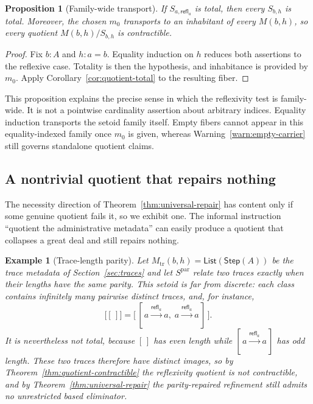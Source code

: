 \documentclass[10pt,reqno]{amsart}
\newtheorem{proposition}[theorem]{Proposition}
\newtheorem{example}[theorem]{Example}
\newcommand{\Step}{\mathsf{Step}}
\newcommand{\refl}{\mathsf{refl}}
\newcommand{\List}{\mathsf{List}}
\newcommand{\Empty}{[\,]}
\begin{document}
\begin{proposition}[Family-wide transport]
\label{prop:family-total}
If \(S_{a,\refl_a}\) is total, then every \(S_{b,h}\) is total.  Moreover, the
chosen \(m_0\) transports to an inhabitant of every \(M(b,h)\), so every
quotient \(M(b,h)/S_{b,h}\) is contractible.
\end{proposition}

\begin{proof}
Fix \(b:A\) and \(h:a=b\).  Equality induction on \(h\) reduces both assertions
to the reflexive case.  Totality is then the hypothesis, and inhabitance is
provided by \(m_0\).  Apply Corollary~\ref{cor:quotient-total} to the resulting
fiber.
\end{proof}

This proposition explains the precise sense in which the reflexivity test is
family-wide.  It is not a pointwise cardinality assertion about arbitrary
indices.  Equality induction transports the setoid family itself.  Empty
fibers cannot appear in this equality-indexed family once \(m_0\) is given,
whereas Warning~\ref{warn:empty-carrier} still governs standalone quotient
claims.

\subsection{A nontrivial quotient that repairs nothing}
\label{subsec:parity}

The necessity direction of Theorem~\ref{thm:universal-repair} has content only
if some genuine quotient fails it, so we exhibit one.  The informal instruction
``quotient the administrative metadata'' can easily
produce a quotient that collapses a great deal and still repairs nothing.

\begin{example}[Trace-length parity]
\label{ex:parity}
Let \(M_{\mathrm{tr}}(b,h)=\List(\Step(A))\) be the trace metadata of
Section~\ref{sec:traces} and let \(S^{\mathrm{par}}\) relate two traces exactly
when their lengths have the same parity.  This setoid is far from discrete: each
class contains infinitely many pairwise distinct traces, and, for instance,
\[
 \bigl[\Empty\bigr]
 =
 \bigl[\,[\,a\xrightarrow{\refl_a}a,\;a\xrightarrow{\refl_a}a\,]\,\bigr].
\tag{5.8}\label{eq:parity-collapse}
\]
It is nevertheless not total, because \(\Empty\) has even length while
\([\,a\xrightarrow{\refl_a}a\,]\) has odd length.  These two traces therefore
have distinct images, so by Theorem~\ref{thm:quotient-contractible} the
reflexivity quotient is not contractible, and by
Theorem~\ref{thm:universal-repair} the parity-repaired refinement still admits
no unrestricted based eliminator.
\end{example}
\end{document}
